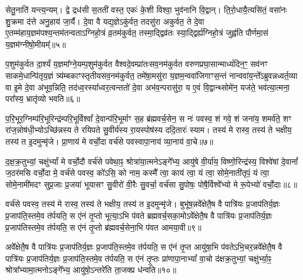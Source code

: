 सेतु॒नाति॑ यन्त्य॒न्यम्। द्वे द्रध॑सी स॒तती॑ वस्त॒ एकः॑ के॒शी विश्वा॒ भुव॑नानि वि॒द्वान्। ति॒रो॒धायै॒त्यसि॑तं॒ वसा॑नः शु॒क्रमा द॑त्ते अनु॒हाय॑ जा॒र्यै। दे॒वा वै यद्य॒ज्ञे\-ऽकु॑र्वत॒ तदसु॑रा अकुर्वत॒ ते दे॒वा ए॒तम्म॑हाय॒ज्ञम॑पश्य॒न्तम॑तन्वता\-ऽ\-ग्निहो॒त्रं व्र॒तम॑कुर्वत॒ तस्मा॒द्द्विव्र॑तः स्या॒द्द्विर्\mbox{}ह्य॑ग्निहो॒त्रं जुह्व॑ति पौर्णमा॒सं य॒ज्ञम॑ग्नीषो॒मीयम्᳚॥५॥

प॒शुम॑कुर्वत दा॒र्श्यं य॒ज्ञमा᳚ग्ने॒यम्प॒शुम॑कुर्वत वैश्वदे॒वम्प्रा॑तःसव॒नम॑कुर्वत वरुणप्रघा॒सान्माध्यं॑दिन॒ꣳ॒ सव॑नꣳ साकमे॒धान्पि॑तृय॒ज्ञं त्र्य॑म्बकाꣳस्तृतीयसव॒नम॑कुर्वत॒ तमे॑षा॒मसु॑रा य॒ज्ञम॒न्ववा॑जिगाꣳस॒न्तं नान्ववा॑य॒न्ते᳚\-ऽब्रुवन्नध्वर्त॒व्या वा इ॒मे दे॒वा अ॑भूव॒न्निति॒ तद॑ध्व॒रस्या᳚ध्वर॒त्वन्ततो॑ दे॒वा अभ॑व॒न्परासु॑रा॒ य ए॒वं वि॒द्वान्थ्सोमे॑न॒ यज॑ते॒ भव॑त्या॒त्मना॒ परा᳚स्य॒ भ्रातृ॑व्यो भवति॥६॥

{\anuvakamend[{अप॑श्यन्तो\-ऽग्नीषो॒मीय॑मा॒त्मना॒ परा॒ त्रीणि॑ च॥२॥}]}

प॒रि॒भूर॒ग्निम्प॑रि॒भूरिन्द्र॑म्परि॒भूर्विश्वां᳚ दे॒वान्प॑रि॒भूर्माꣳ स॒ह ब्र॑ह्मवर्च॒सेन॒ स नः॑ पवस्व॒ शं गवे॒ शं जना॑य॒ शमर्व॑ते॒ शꣳ रा॑ज॒न्नोष॑धी॒भ्यो\-ऽच्छि॑न्नस्य ते रयिपते सु॒वीर्य॑स्य रा॒यस्पोष॑स्य ददि॒तारः॑ स्याम। तस्य॑ मे रास्व॒ तस्य॑ ते भक्षीय॒ तस्य॑ त इ॒दमुन्मृ॑जे। प्रा॒णाय॑ मे वर्चो॒दा वर्च॑से पवस्वापा॒नाय॑ व्या॒नाय॑ वा॒चे॥७॥

द॒क्ष॒क्र॒तुभ्यां॒ चक्षु॑र्भ्यां मे वर्चो॒दौ वर्च॑से पवेथा॒ꣴ॒ श्रोत्रा॑या॒त्मने\-ऽङ्गे᳚भ्य॒ आयु॑षे वी॒र्या॑य॒ विष्णो॒रिन्द्र॑स्य॒ विश्वे॑षां दे॒वानां᳚ ज॒ठर॑मसि वर्चो॒दा मे॒ वर्च॑से पवस्व॒ को॑\-ऽसि॒ को नाम॒ कस्मै᳚ त्वा॒ काय॑ त्वा॒ यं त्वा॒ सोमे॒नाती॑तृपं॒ यं त्वा॒ सोमे॒नामी॑मदꣳ सुप्र॒जाः प्र॒जया॑ भूयासꣳ सु॒वीरो॑ वी॒रैः सु॒वर्चा॒ वर्च॑सा सु॒पोषः॒ पोषै॒र्विश्वे᳚भ्यो मे रू॒पेभ्यो॑ वर्चो॒दाः॥८॥

वर्च॑से पवस्व॒ तस्य॑ मे रास्व॒ तस्य॑ ते भक्षीय॒ तस्य॑ त इ॒दमुन्मृ॑जे। बुभू॑ष॒न्नवे᳚क्षेतै॒ष वै पात्रि॑यः प्र॒जाप॑तिर्य॒ज्ञः प्र॒जाप॑ति॒स्तमे॒व त॑र्पयति॒ स ए॑नं तृ॒प्तो भूत्या॒\-ऽभि प॑वते ब्रह्मवर्च॒सका॒मो\-ऽवे᳚क्षेतै॒ष वै पात्रि॑यः प्र॒जाप॑तिर्य॒ज्ञः प्र॒जाप॑तिस्तमे॒व त॑र्पयति॒ स ए॑नं तृ॒प्तो ब्र॑ह्मवर्च॒सेना॒भि प॑वत आमया॒वी॥९॥

अवे᳚क्षेतै॒ष वै पात्रि॑यः प्र॒जाप॑तिर्य॒ज्ञः प्र॒जाप॑ति॒स्तमे॒व त॑र्पयति॒ स ए॑नं तृ॒प्त आयु॑षा॒भि प॑वते\-ऽभि॒चर॒न्नवे᳚क्षेतै॒ष वै पात्रि॑यः प्र॒जाप॑तिर्य॒ज्ञः प्र॒जाप॑ति॒स्तमे॒व त॑र्पयति॒ स ए॑नं तृ॒प्तः प्रा॑णापा॒ना\-भ्यां᳚ वा॒चो द॑क्षक्र॒तुभ्यां॒ चक्षु॑र्भ्या॒ꣴ॒ श्रोत्रा᳚भ्यामा॒त्मनो\-ऽङ्गे᳚भ्य॒ आयु॑षो॒\-ऽन्तरे॑ति ता॒जक्प्र ध॑न्वति॥१०॥

{\anuvakamend[{वा॒चे रू॒पेभ्यो॑ वर्चो॒दा आ॑मया॒वी पञ्च॑चत्वारिꣳशच्च॥३॥}]}

